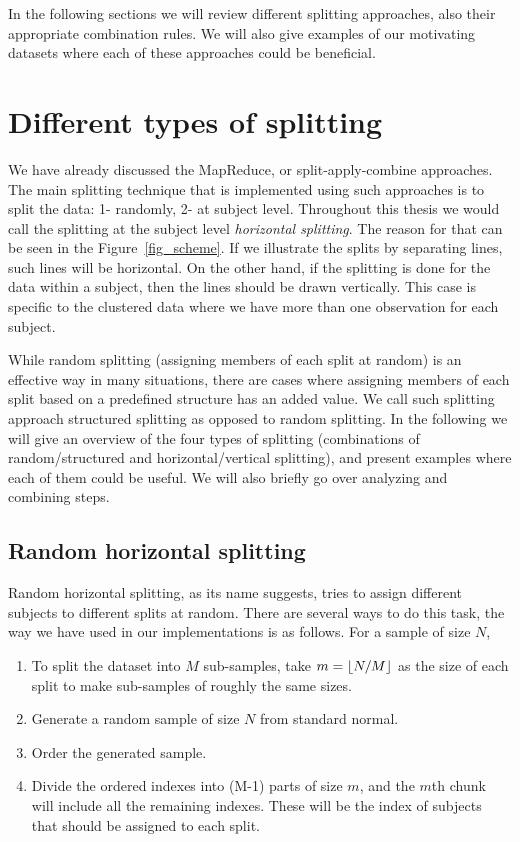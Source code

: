 \documentclass[11pt,a5paper,twoside]{book}
\DeclarePairedDelimiter\floor{\lfloor}{\rfloor}
\begin{document}
In the following sections we will review different splitting approaches, also their appropriate combination rules. We will also give examples of our motivating datasets where each of these approaches could be beneficial. 

\section{Different types of splitting}
\label{sec_int_random_horizontal}

We have already discussed the MapReduce, or split-apply-combine approaches. The main splitting technique that is implemented using such approaches is to split the data: 1- randomly, 2- at subject level. Throughout this thesis we would call the splitting at the subject level \emph{horizontal splitting}. The reason for that can be seen in the Figure~\ref{fig_scheme}. If we illustrate the splits by separating lines, such lines will be horizontal. On the other hand, if the splitting is done for the data within a subject, then the lines should be drawn vertically. This case is specific to the clustered data where we have more than one observation for each subject. 

While random splitting (assigning members of each split at random) is an effective way in many situations, there are cases where assigning members of each split based on a predefined structure has an added value. We call such splitting approach structured splitting as opposed to random splitting. In the following we will give an overview of the four types of splitting (combinations of random/structured and horizontal/vertical splitting), and present examples where each of them could be useful. We will also briefly go over analyzing and combining steps.

\subsection{Random horizontal splitting}    

Random horizontal splitting, as its name suggests, tries to assign different subjects to different splits at random. There are several ways to do this task, the way we have used in our implementations is as follows. For a sample of size $N$,

\begin{enumerate}
\item To split the dataset into $M$ sub-samples, take $m = \floor{N/M}$ as the size of each split to make sub-samples of roughly the same sizes.
\item Generate a random sample of size $N$ from standard normal.
\item Order the generated sample.
\item Divide the ordered indexes into (M-1) parts of size $m$, and the $m$th chunk will include all the remaining indexes. These will be the index of subjects that should be assigned to each split.
\end{enumerate}
\end{document}
